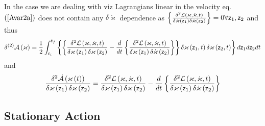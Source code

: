 In the case we are dealing with viz Lagrangians linear in the velocity eq. $%
\left( \ref{Avar2a}\right) $ does not contain any $\delta \dot{\varkappa}$
dependence as $\left\{ \frac{\delta ^{2}{\cal L}\left( \varkappa ,\dot{%
\varkappa},t\right) }{\delta \dot{\varkappa}\left( {\sf z}_{1}\right) \delta 
\dot{\varkappa}\left( {\sf z}_{2}\right) }\right\} =0\forall {\sf z}_{1},%
{\sf z}_{2}$ and thus 
\begin{equation}
\delta ^{\left( 2\right) }{\cal A}\left( \varkappa \right) =\frac{1}{2}%
\int_{t_{i}}^{t_{f}}\left\{ \left\{ \frac{\delta ^{2}{\cal L}\left( {\cal %
\varkappa },{\cal \dot{\varkappa}},t\right) }{\delta \varkappa \left( {\sf z}%
_{1}\right) \delta \varkappa \left( {\sf z}_{2}\right) }-\frac{d}{dt}\left\{ 
\frac{\delta ^{2}{\cal L}\left( \varkappa ,\dot{\varkappa},t\right) }{\delta
\varkappa \left( {\sf z}_{1}\right) \delta \dot{\varkappa}\left( {\sf z}%
_{2}\right) }\right\} \right\} \delta \varkappa \left( {\sf z}_{1},t\right)
\delta \varkappa \left( {\sf z}_{2},t\right) \right\} d{\sf z}_{1}d{\sf z}%
_{2}dt
\end{equation}%
and 
\begin{equation}
\frac{\delta ^{2}{\cal \dot{A}}\left( \varkappa \left( t\right) \right) }{%
\delta \varkappa \left( {\sf z}_{1}\right) \delta \varkappa \left( {\sf z}%
_{2}\right) }=\frac{\delta ^{2}{\cal L}\left( {\cal \varkappa },{\cal \dot{%
\varkappa}},t\right) }{\delta \varkappa \left( {\sf z}_{1}\right) \delta
\varkappa \left( {\sf z}_{2}\right) }-\frac{d}{dt}\left\{ \frac{\delta ^{2}%
{\cal L}\left( \varkappa ,\dot{\varkappa},t\right) }{\delta \varkappa \left( 
{\sf z}_{1}\right) \delta \dot{\varkappa}\left( {\sf z}_{2}\right) }\right\}
\end{equation}

\subsection{Stationary Action}


